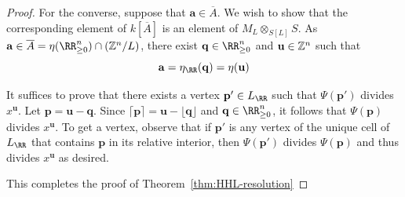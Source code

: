 \documentclass{amsart}
\begin{document}
\begin{proof}
  For the converse, suppose that $\mathbf{a}\in \overline{A}$. We wish to show that the corresponding element of $k[\overline{A}]$ is an element of $M_L\otimes_{S[L]} S$.
  As $\mathbf{a}\in \overline{A} = \eta(\RR_{\geq 0}^n)\cap (\ZZ^n/L)$, there exist
  $\mathbf{q}\in \RR_{\geq 0}^n$ and $\mathbf{u}\in \mathbb Z^n$ such that
  \[\mathbf{a} = \eta_{\RR}(\mathbf{q}) = \eta(\mathbf{u})\]

  It suffices to prove that there exists a vertex $\mathbf{p}'\in L_{\RR}$ such that $\Psi(\mathbf{p}')$ divides $x^{\mathbf{u}}$.
  Let $\mathbf{p}=\mathbf{u}-\mathbf{q}$. Since $\lceil \mathbf{p} \rceil = \mathbf{u} - \lfloor \mathbf{q}\rfloor$ and $\mathbf{q}\in \RR_{\geq 0}^n$, it follows that $\Psi(\mathbf{p})$ divides $x^{\mathbf{u}}$. To get a vertex, observe that if $\mathbf{p}'$ is any vertex of the unique cell of $L_{\RR}$ that contains $\mathbf{p}$ in its relative interior, then $\Psi(\mathbf{p}')$ divides $\Psi(\mathbf{p})$ and thus divides $x^{\mathbf{u}}$ as desired.


 This completes the proof of Theorem~\ref{thm:HHL-resolution}
 \end{proof}
  
\end{document}
